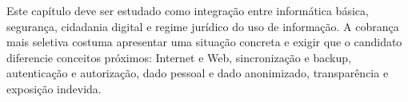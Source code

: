 \begin{resumo}
Este capítulo deve ser estudado como integração entre informática básica, segurança, cidadania digital e regime jurídico do uso de informação. A cobrança mais seletiva costuma apresentar uma situação concreta e exigir que o candidato diferencie conceitos próximos: Internet e Web, sincronização e backup, autenticação e autorização, dado pessoal e dado anonimizado, transparência e exposição indevida.
\end{resumo}
